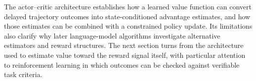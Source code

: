 The actor--critic architecture establishes how a learned value function
can convert delayed trajectory outcomes into state-conditioned advantage
estimates, and how those estimates can be combined with a constrained
policy update. Its limitations also clarify why later language-model
algorithms investigate alternative estimators and reward structures. The
next section turns from the architecture used to estimate value toward
the reward signal itself, with particular attention to reinforcement
learning in which outcomes can be checked against verifiable task
criteria.
